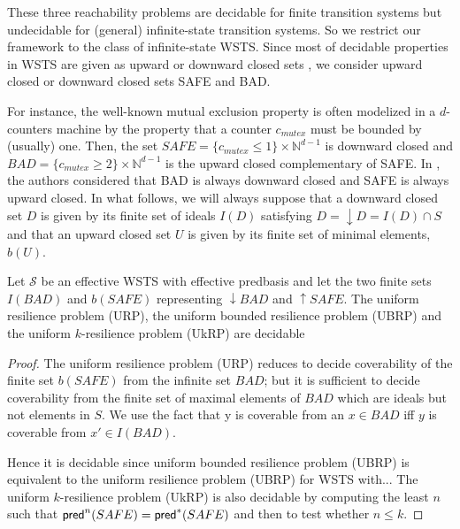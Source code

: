 These three reachability problems are decidable for finite transition systems but undecidable for (general) infinite-state transition systems. 
So we restrict our framework to the class of infinite-state WSTS. Since most of decidable properties in WSTS are given as upward or downward closed sets \cite{DBLP:journals/iandc/AbdullaCJT00, DBLP:journals/tcs/FinkelS01}, we consider upward closed or downward closed sets SAFE and BAD.

For instance, the well-known mutual exclusion property is often modelized in a $d$-counters machine by the property that a counter $c_{mutex}$ must be bounded by (usually) one. Then, the set $SAFE =  \{c_{mutex} \leq 1\} \times \mathbb{N}^{d-1}$ is downward closed and $BAD =\{c_{mutex} \geq 2\} \times  \mathbb{N}^{d-1} $ is the upward closed complementary of SAFE. In \cite{DBLP:conf/gg/Ozkan22}, the authors considered that BAD is always downward closed and SAFE is always upward closed.
%		
In what follows, we will always suppose that a downward closed set $D$ is given by its finite set of ideals $I(D)$ satisfying $D=\downarrow D =I(D) \cap S$and that an upward closed set $U$ is given by its finite set of minimal elements, $b(U)$.




\begin{proposition}\label{down-up}
Let $\mathscr{S}$ be an effective WSTS with effective predbasis and let the two finite sets $I(BAD)$ and  $b(SAFE)$ representing $\downarrow BAD$ and $\uparrow SAFE$.
The uniform resilience problem (URP), the uniform bounded resilience problem (UBRP) and the uniform $k$-resilience problem (UkRP) are decidable
\end{proposition}

\begin{proof}
The uniform resilience problem (URP) reduces to decide coverability of the finite set $b(SAFE)$ from the infinite set $BAD$; but it is sufficient to decide coverability from the finite set of maximal elements of $BAD$ which are ideals but not elements in $S$. We use the fact that y is coverable from an $x \in BAD$ iff $y$ is coverable from $x' \in I(BAD)$.


Hence it is decidable since
uniform bounded resilience problem (UBRP) is equivalent to the uniform resilience problem (UBRP) for WSTS with...
The uniform $k$-resilience problem (UkRP) is also decidable by computing the least $n$ such that $\textsf{pred}^n(SAFE)=\textsf{pred}^*(SAFE)$ and then to test whether $n \leq k$.
\end{proof}


